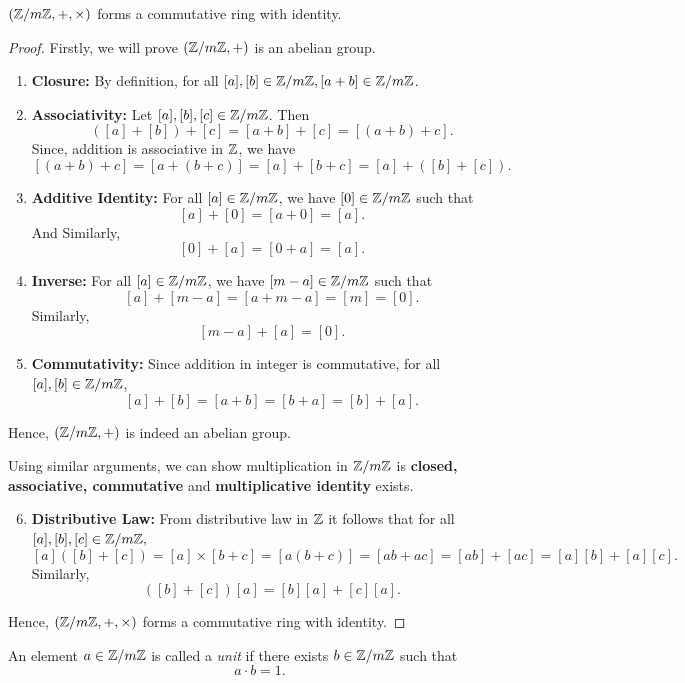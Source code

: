 \begin{prop}
    $(\mathbb{Z}/m\mathbb{Z}, +, \times)$ forms a commutative ring with identity.
\end{prop}
\begin{proof}
    Firstly, we will prove $(\mathbb{Z}/m\mathbb{Z}, +)$ is an abelian group.
    \begin{enumerate}
        \item \textbf{Closure:} By definition, for all $[a], [b] \in \mathbb{Z}/m\mathbb{Z}, [a+b] \in \mathbb{Z}/m\mathbb{Z}$.
        \item \textbf{Associativity:} Let $[a], [b], [c] \in \mathbb{Z}/m\mathbb{Z}$. Then \[([a] + [b]) + [c] = [a+b] + [c] = [(a+b) + c].\]
        Since, addition is associative in $\mathbb{Z}$, we have
        \[[(a+b) + c] = [a+(b+c)] = [a] + [b+c] = [a] + ([b] + [c]).\]
        \item \textbf{Additive Identity:} For all $[a] \in \mathbb{Z}/m\mathbb{Z}$, we have $[0] \in \mathbb{Z}/m\mathbb{Z}$ such that
        \[[a] + [0] = [a + 0] = [a].\]
        And Similarly,
        \[[0] + [a] = [0 + a] = [a].\]
        \item \textbf{Inverse:} For all $[a] \in \mathbb{Z}/m\mathbb{Z}$, we have $[m - a] \in \mathbb{Z}/m\mathbb{Z}$ such that
        \[[a] + [m - a] = [a + m - a] = [m] = [0].\]
        Similarly, \[[m - a] + [a] = [0].\]
        \item \textbf{Commutativity:} Since addition in integer is commutative, for all $[a], [b] \in \mathbb{Z}/m\mathbb{Z}$, \[[a] + [b] = [a + b] = [b + a] = [b] + [a].\]
    \end{enumerate}
    Hence, $(\mathbb{Z}/m\mathbb{Z}, +)$ is indeed an abelian group.

    Using similar arguments, we can show multiplication in $\Z/m\Z$ is \textbf{closed, associative, commutative} and \textbf{multiplicative identity} exists.

    \begin{enumerate}
        \setcounter{enumi}{5}
        \item \textbf{Distributive Law:} From distributive law in $\mathbb{Z}$ it follows that for all $[a], [b], [c] \in \mathbb{Z}/m\mathbb{Z},$
        \[[a]([b]+[c]) = [a] \times [b+c] = [a(b+c)] = [ab + ac] = [ab] + [ac] = [a][b] + [a][c].\]
        Similarly, \[([b]+[c])[a] = [b][a] + [c][a].\]
    \end{enumerate}
    Hence, $(\mathbb{Z}/m\mathbb{Z}, +, \times)$ forms a commutative ring with identity.
\end{proof}
\begin{definition}[Unit in $\Z/m\Z$]
An element $ a \in \mathbb{Z}/m\mathbb{Z}$ is called a \textit{unit} if there exists $ b \in \mathbb{Z}/m\mathbb{Z} $ such that  
\[
a \cdot b = 1.
\]  
\end{definition}  
